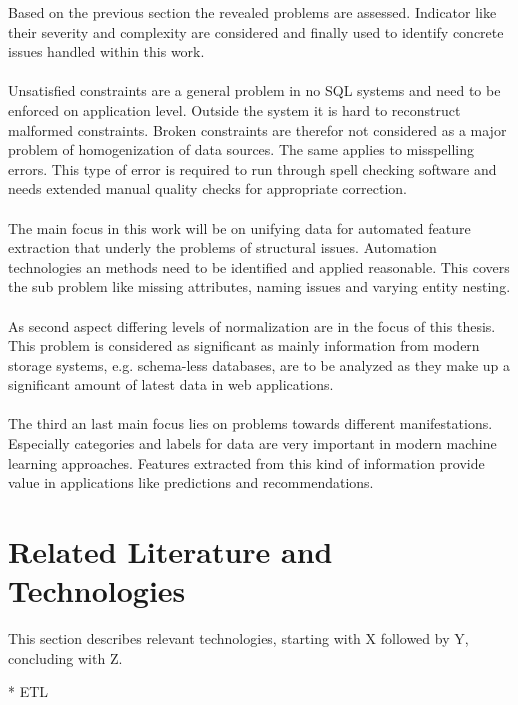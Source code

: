 Based on the previous section the revealed problems are assessed. Indicator like their severity and complexity are considered and finally used to identify concrete issues handled within this work. 
\\\\
Unsatisfied constraints are a general problem in no SQL systems and need to be enforced on application level. Outside the system it is hard to reconstruct malformed constraints. Broken constraints are therefor not considered as a major problem of homogenization of data sources. The same applies to misspelling errors. This type of error is required to run through spell checking software and needs extended manual quality checks for appropriate correction. 
\\\\
The main focus in this work will be on unifying data for automated feature extraction that underly the problems of structural issues. Automation technologies an methods need to be identified and applied reasonable. This covers the sub problem like missing attributes, naming issues and varying entity nesting.
\\\\
As second aspect differing levels of normalization are in the focus of this thesis. This problem is considered as significant as mainly information from modern storage systems, e.g. schema-less databases, are to be analyzed as they make up a significant amount of latest data in web applications.
\\\\
The third an last main focus lies on problems towards different manifestations. Especially categories and labels for data are very important in modern machine learning approaches. Features extracted from this kind of information provide value in applications like predictions and recommendations.

\section{Related Literature and Technologies \label{sec:tech}}


This section describes relevant technologies, starting with X followed by Y, concluding with Z.

* ETL
